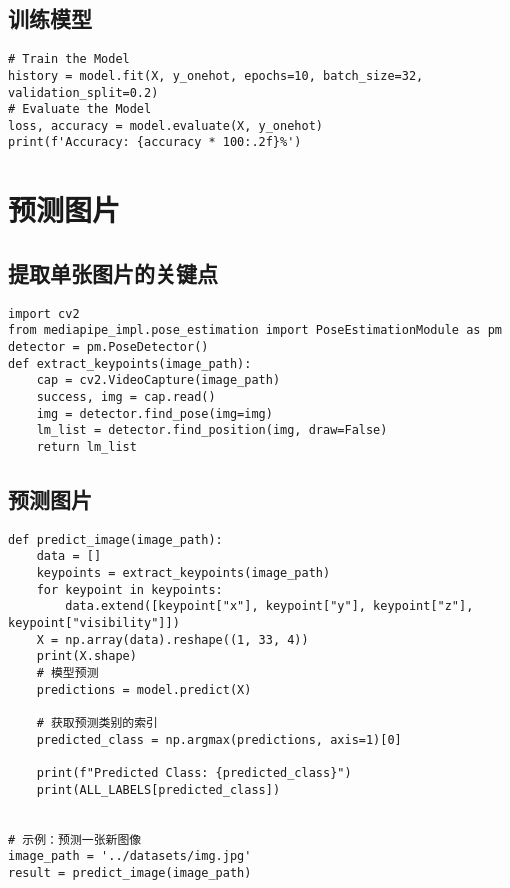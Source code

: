 \subsection{训练模型}

\begin{lstlisting}
# Train the Model
history = model.fit(X, y_onehot, epochs=10, batch_size=32, validation_split=0.2)
# Evaluate the Model
loss, accuracy = model.evaluate(X, y_onehot)
print(f'Accuracy: {accuracy * 100:.2f}%')
\end{lstlisting}

\section{预测图片}

\subsection{提取单张图片的关键点}

\begin{lstlisting}
import cv2
from mediapipe_impl.pose_estimation import PoseEstimationModule as pm
detector = pm.PoseDetector()
def extract_keypoints(image_path):
    cap = cv2.VideoCapture(image_path)
    success, img = cap.read()
    img = detector.find_pose(img=img)
    lm_list = detector.find_position(img, draw=False)
    return lm_list
\end{lstlisting}

\subsection{预测图片}

\begin{lstlisting}
def predict_image(image_path):
    data = []
    keypoints = extract_keypoints(image_path)
    for keypoint in keypoints:
        data.extend([keypoint["x"], keypoint["y"], keypoint["z"], keypoint["visibility"]])
    X = np.array(data).reshape((1, 33, 4))
    print(X.shape)
    # 模型预测
    predictions = model.predict(X)

    # 获取预测类别的索引
    predicted_class = np.argmax(predictions, axis=1)[0]

    print(f"Predicted Class: {predicted_class}")
    print(ALL_LABELS[predicted_class])


# 示例：预测一张新图像
image_path = '../datasets/img.jpg'
result = predict_image(image_path)
\end{lstlisting}

